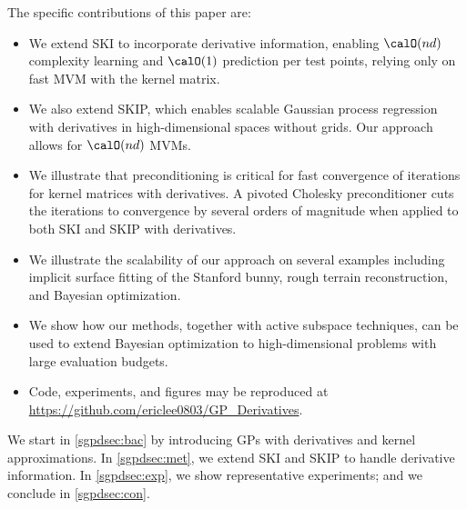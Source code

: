 The specific contributions of this paper are:
\begin{itemize}
  \item We extend SKI to incorporate derivative information, enabling $\calO
  (nd)$ complexity learning and $\calO(1)$ prediction per test points, relying
  only on fast MVM with the kernel matrix.

  \item We also extend SKIP, which enables scalable Gaussian process regression
  with derivatives in high-dimensional spaces without grids.  Our approach
  allows for $\calO(nd)$ MVMs.

  \item We illustrate that preconditioning is critical for fast convergence of
  iterations for kernel matrices with derivatives.  A pivoted Cholesky
  preconditioner cuts the iterations to convergence by several orders of
  magnitude when applied to both SKI and SKIP with derivatives.

  \item We illustrate the scalability of our approach on several examples
  including implicit surface fitting of the Stanford bunny, rough terrain
  reconstruction, and Bayesian optimization.

  \item We show how our methods, together with active subspace techniques, can
  be used to extend Bayesian optimization to high-dimensional problems with
  large evaluation budgets.

  \item Code, experiments, and figures may be reproduced at 
  \url{https://github.com/ericlee0803/GP_Derivatives}.
\end{itemize}

We start in \cref{sgpdsec:bac} by introducing GPs with derivatives and kernel
approximations.  In \cref{sgpdsec:met}, we extend SKI and SKIP to handle
derivative information. In \cref{sgpdsec:exp}, we show representative
experiments; and we conclude in \cref{sgpdsec:con}.